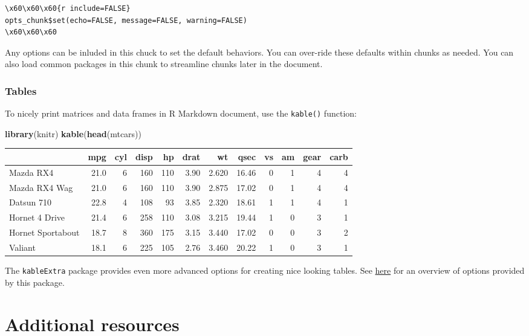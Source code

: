 \documentclass[]{article}
\newenvironment{Shaded}{\begin{snugshade}}{\end{snugshade}}
\newcommand{\KeywordTok}[1]{\textcolor[rgb]{0.13,0.29,0.53}{\textbf{#1}}}
\newcommand{\NormalTok}[1]{#1}
\begin{document}
\begin{verbatim}
\x60\x60\x60{r include=FALSE}
opts_chunk$set(echo=FALSE, message=FALSE, warning=FALSE)
\x60\x60\x60
\end{verbatim}

Any options can be inluded in this chuck to set the default behaviors.
You can over-ride these defaults within chunks as needed. You can also
load common packages in this chunk to streamline chunks later in the
document.

\hypertarget{tables}{%
\subsubsection{Tables}\label{tables}}

To nicely print matrices and data frames in R Markdown document, use the
\texttt{kable()} function:

\begin{Shaded}
\begin{Highlighting}[]
\KeywordTok{library}\NormalTok{(knitr)}
\KeywordTok{kable}\NormalTok{(}\KeywordTok{head}\NormalTok{(mtcars))}
\end{Highlighting}
\end{Shaded}

\begin{longtable}[]{@{}lrrrrrrrrrrr@{}}
\toprule
& mpg & cyl & disp & hp & drat & wt & qsec & vs & am & gear &
carb\tabularnewline
\midrule
\endhead
Mazda RX4 & 21.0 & 6 & 160 & 110 & 3.90 & 2.620 & 16.46 & 0 & 1 & 4 &
4\tabularnewline
Mazda RX4 Wag & 21.0 & 6 & 160 & 110 & 3.90 & 2.875 & 17.02 & 0 & 1 & 4
& 4\tabularnewline
Datsun 710 & 22.8 & 4 & 108 & 93 & 3.85 & 2.320 & 18.61 & 1 & 1 & 4 &
1\tabularnewline
Hornet 4 Drive & 21.4 & 6 & 258 & 110 & 3.08 & 3.215 & 19.44 & 1 & 0 & 3
& 1\tabularnewline
Hornet Sportabout & 18.7 & 8 & 360 & 175 & 3.15 & 3.440 & 17.02 & 0 & 0
& 3 & 2\tabularnewline
Valiant & 18.1 & 6 & 225 & 105 & 2.76 & 3.460 & 20.22 & 1 & 0 & 3 &
1\tabularnewline
\bottomrule
\end{longtable}

The \texttt{kableExtra} package provides even more advanced options for
creating nice looking tables. See
\href{https://haozhu233.github.io/kableExtra/awesome_table_in_html.html}{here}
for an overview of options provided by this package.

\hypertarget{additional-resources}{%
\section{Additional resources}\label{additional-resources}}
\end{document}
